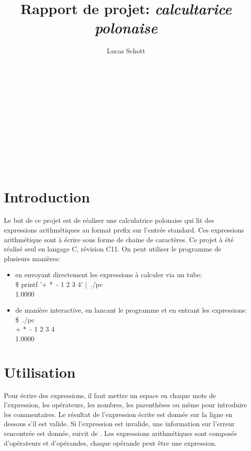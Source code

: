\documentclass[a4paper,11pt,DIV=11]{scrartcl}
\title{Rapport de projet: \emph{calcultarice polonaise}}
\author{Lucas Schott}
\begin{document}
\begin{onehalfspace}

    \maketitle
     \\ \\ \\ \\ \\ \\ \\ \\ \\


    \section*{Introduction}


    Le but de ce projet est de réaliser une calculatrice polonaise qui lit des
    expressions arithmétiques au format prefix sur l'entrée standard. Ces expressions arithmétique
    sont à écrire sous forme de chaine de caractères. Ce projet à été réalisé seul en langage C,
    révision C11.
    On peut utiliser le programme de plusieurs manières:

    \begin{itemize}
        \item en envoyant directement les expressions à calculer via un tube:\\
            {\selectfont \$ printf '+ * - 1 2 3 4' | ./pc\\
            1.0000}
        \item de manière interactive, en lancant le programme et en entrant les expressions:\\
            {\selectfont \$ ./pc\\
            + * - 1 2 3 4\\
            1.0000}
            \\
    \end{itemize}


    \section*{Utilisation}


    Pour écrire des expressions, il faut mettre un espace en chaque mots de l'expression, les
    opérateurs, les nombres, les parenthèses ou même {\selectfont \say{\#}}
    pour introduire les commentaires. Le résultat de l'expression écrite est donnée sur la ligne
    en dessous s'il est valide. Si l'expression est invalide, une information sur l'erreur
    rencontrée est donnée, suivit de {\selectfont\mbox{}}. Les
    expressions arithmétiques sont composés d'opérateurs et d'opérandes, chaque opérande peut être
    une expression.\\


\end{onehalfspace}
\end{document}
